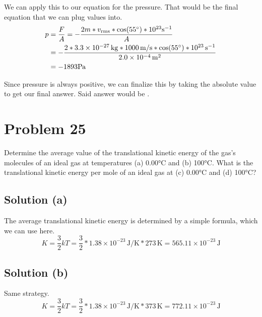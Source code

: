 \documentclass[12pt]{article}
\newcommand{\E}[1]{\times 10^{#1}}
\begin{document}
            We can apply this to our equation for the pressure.
            That would be the final equation that we can plug values into.
            \begin{align}
                p   &=  \frac{F}{A}
                    =   -\frac{2m * v_{\rm rms} * \cos(55\unit{\degree}) * 10^{23} \unit{\second^{-1}}}{A}\\
                    &=  -\frac{2 * 3.3 \times 10^{-27}\,\unit{\kilo\gram} * 1000\,\unit{\meter/\second} * \cos(55\unit{\degree}) * 10^{23}\,\unit{\second^{-1}}}{2.0 \times 10^{-4}\,\unit{\meter^2}}\\
                    &=  -1893 \unit{\pascal}
            \end{align}

            Since pressure is always positive, we can finalize this by taking the absolute value to get our final answer.
            Said answer would be . 

    \pagebreak
    \section{Problem 25}
        Determine the average value of the translational kinetic energy of the gas's molecules of an ideal gas at temperatures (a) 0.00\unit{\celsius} and (b) 100\unit{\celsius}.
        What is the translational kinetic energy per mole of an ideal gas at (c) 0.00\unit{\celsius} and (d) 100\unit{\celsius}?

        \subsection{Solution (a)}
            The average translational kinetic energy is determined by a simple formula, which we can use here.
            \begin{equation}
                K   =   \frac{3}{2} kT
                    =   \frac{3}{2} * 1.38\E{-23}\,\unit{\joule/\kelvin} * 273\,\unit{\kelvin}
                    =   \boxed{565.11\E{-23}\,\unit{\joule}}
            \end{equation}

        \subsection{Solution (b)}
            Same strategy.
            \begin{equation}
                K   =   \frac{3}{2} kT
                    =   \frac{3}{2} * 1.38\E{-23}\,\unit{\joule/\kelvin} * 373\,\unit{\kelvin}
                    =   \boxed{772.11\E{-23}\,\unit{\joule}}
            \end{equation}
\end{document}
